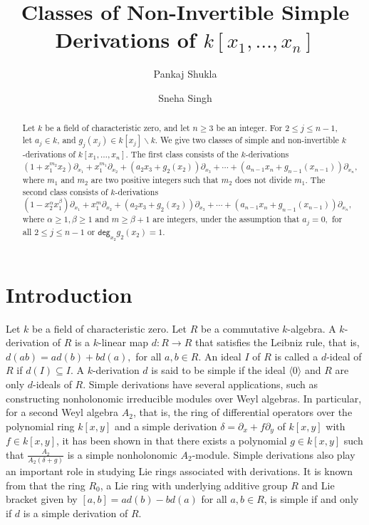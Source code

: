 \documentclass[12pt,reqno]{amsart}
\title{Classes of Non-Invertible Simple Derivations of $k[x_1,\ldots,x_n]$}
\author{Pankaj Shukla}
\author{Sneha Singh}
\renewcommand{\deg}{\mathsf{deg}}
\renewcommand{\setminus}{\smallsetminus}
\renewcommand{\leq}{\leqslant}
\renewcommand{\geq}{\geqslant}
\numberwithin{thm}{section}
\theoremstyle{definition}
\numberwithin{equation}{thm}
\theoremstyle{plain}
\begin{document}
\begin{abstract}
   Let $k$ be a field of characteristic zero, and let $n\geq 3$ be an integer. For $2\leq j\leq n-1$, let $a_j\in k$, and $g_j(x_j)\in k[x_j]\setminus k.$ We give two classes of simple and non-invertible $k$-derivations of $k[x_1,\ldots,x_n].$ The first class consists of the $k$-derivations $(1 +x_1^{m_2}x_2)\partial_{x_1}+x_1^{m_1}\partial_{x_2}+(a_2 x_3 +g_2(x_2))\partial_{x_3}+\cdots+(a_{n-1}x_n + g_{n-1}(x_{n-1}))\partial_{x_n},$ where $m_1$ and $m_2$ are two positive integers such that $m_2$ does not divide $m_1$. The second class consists of $k$-derivations $(1-x_2^{\alpha} x_1^{\beta})\partial_{x_1} +x_1^m\partial_{x_2}+(a_2 x_3 +g_2(x_2))\partial_{x_3}+\cdots+(a_{n-1}x_n + g_{n-1}(x_{n-1}))\partial_{x_n},$ where $\alpha\geq 1,\beta\geq 1$ and $m\geq \beta+1$ are integers, under the assumption that $a_j=0,$ for all $2\leq j\leq n-1$ or $\deg_{x_2}g_2(x_2)=1$. 
\end{abstract}
\maketitle
\section{Introduction}
Let $k$ be a field of characteristic zero. Let $R$ be a commutative $k$-algebra. A $k$-derivation of $R$ is a $k$-linear map $d:R\to R$ that satisfies the Leibniz rule, that is, $d(ab)=ad(b)+bd(a),$ for all $a,b\in R.$ An ideal $I$ of $R$ is called a $d$-ideal of $R$ if $d(I)\subseteq I.$ A $k$-derivation $d$ is said to be simple if the ideal $\langle0\rangle$ and $R$ are only $d$-ideals of $R$. Simple derivations have several applications, such as constructing nonholonomic irreducible modules over Weyl algebras. In particular, for a second Weyl algebra $A_2$, that is, the ring of differential operators over the polynomial ring $k[x,y]$ and a simple derivation $\delta=\partial_x+f\partial_y$ of $k[x,y]$ with $f\in k[x,y]$, it has been shown in \cite{DLR06} that there exists a polynomial $g\in k[x,y]$ such that $\frac{A_2}{A_2(\delta+g)}$ is a simple nonholonomic $A_2$-module. Simple derivations also play an important role in studying Lie rings associated with derivations. It is known from \cite{Now85} that the ring $R_0$, a Lie ring with underlying additive group $R$ and Lie bracket given by $[a,b]=ad(b)-bd(a)$ for all $a,b\in R$, is simple if and only if $d$ is a simple derivation of $R$.
\end{document}
